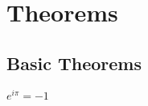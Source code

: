 \chapter{Theorems}
\section{Basic Theorems}
\begin{theorem}
 $e^{i\pi} = -1$ \label{eipi}
\end{theorem}